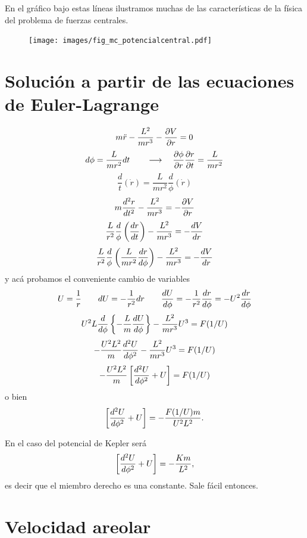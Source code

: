 \documentclass[10pt,oneside]{CBFT_book}
\begin{document}
En el gráfico bajo estas líneas ilustramos muchas de las características de la física del problema
de fuerzas centrales.

\begin{figure}[hbt]
	\begin{center}
	\texttt{[image: images/fig\_mc\_potencialcentral.pdf]}	 
	\end{center}
	\caption{}
\end{figure} 

\section{Solución a partir de las ecuaciones de Euler-Lagrange}

\[
	m \ddot{r} -\frac{L^2}{m r^3} -\dpar{V}{r}= 0 
\]
\[
	d \phi = \frac{L}{m r^2} dt \qquad \longrightarrow \quad  \dpar{\phi}{r}\dpar{r}{t}  = \frac{L}{m r^2}
\]
\[
	\frac{d}{t}(\dot{r}) = \frac{L}{m r^2} \frac{d}{\phi}(\dot{r})
\]
\[
	m \dtot[2]{r}{t} -\frac{L^2}{m r^3} = -\dpar{V}{r}
\]
\[
	\frac{L}{r^2} \frac{d}{\phi}\left( \dtot{r}{t} \right) -\frac{L^2}{m r^3} = -\dtot{V}{r}
\]
\[
	\frac{L}{r^2} \frac{d}{\phi}\left( \frac{L}{m r^2}\dtot{r}{\phi} \right) -\frac{L^2}{m r^3} = -\dtot{V}{r}
\]
y acá probamos el conveniente cambio de variables
\[
	U = \frac{1}{r} \qquad dU = -\frac{1}{r^2} dr 
	\qquad \dtot{U}{\phi} = -\frac{1}{r^2}\dtot{r}{\phi} = -U^2\dtot{r}{\phi}
\]
\[
	U^2 L \frac{d}{d\phi} \left\{ -\frac{L}{m}\dtot{U}{\phi} \right\} - \frac{L^2}{m r^3} U^3 = F(1/U)
\]
\[
	- \frac{U^2 L^2}{m} \dtot[2]{U}{\phi} - \frac{L^2}{m r^3} U^3 = F(1/U)
\]
\[
	- \frac{U^2 L^2}{m} \left[ \dtot[2]{U}{\phi} + U \right] = F(1/U)
\]
o bien 
\[
	\left[ \dtot[2]{U}{\phi} + U \right] = - \frac{F(1/U) m}{U^2 L^2}. 
\]

En el caso del potencial de Kepler será 
\[
	\left[ \dtot[2]{U}{\phi} + U \right] = - \frac{K m}{L^2},
\]
es decir que el miembro derecho es una constante. Sale fácil entonces.

\section{Velocidad areolar}
\end{document}
